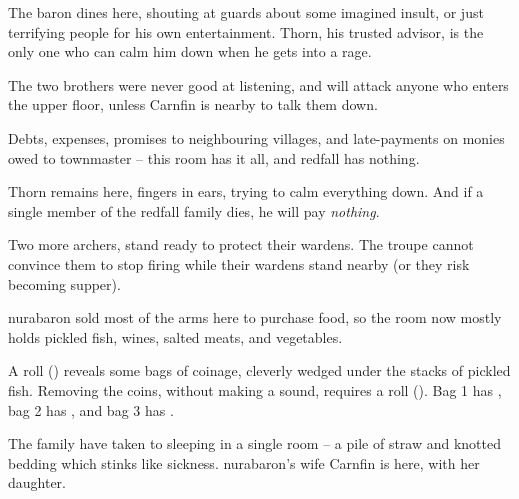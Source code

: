 \begin{multicols}{2}
The baron dines here, shouting at guards about some imagined insult, or just terrifying people for his own entertainment.
Thorn, his trusted advisor, is the only one who can calm him down when he gets into a rage.


The two brothers were never good at listening, and will attack anyone who enters the upper floor, unless Carnfin is nearby to talk them down.



Debts, expenses, promises to neighbouring \glspl{village}, and late-payments on monies owed to \gls{townmaster} -- this room has it all, and \gls{redfall} has nothing.

Thorn remains here, fingers in ears, trying to calm everything down.
And if a single member of the \gls{redfall} family dies, he will pay \emph{nothing}.

\thornSeneschal


Two more archers, stand ready to protect their \glspl{warden}.
The troupe cannot convince them to stop firing while their \glspl{warden} stand nearby (or they risk becoming supper).



\Gls{nurabaron} sold most of the arms here to purchase food, so the room now mostly holds pickled fish, wines, salted meats, and vegetables.

A  roll (\tn[10]) reveals some bags of coinage, cleverly wedged under the stacks of pickled fish.
Removing the coins, without making a sound, requires a  roll (\tn[12]).
Bag 1 has \lootMedium, bag 2 has \lootMedium, and bag 3 has \lootBig.


The family have taken to sleeping in a single room -- a pile of straw and knotted bedding which stinks like sickness.
\Gls{nurabaron}'s wife Carnfin is here, with her daughter.


\end{multicols}

